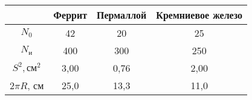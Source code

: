\begin{tabular}{cccc}
\toprule
& Феррит & Пермаллой & Кремниевое железо \\
\midrule
$N_0$               & 42    & 20    & 25    \\
$N_\text{и}$        & 400   & 300   & 250   \\
$S^2, \text{см}^2$  & 3,00  & 0,76  & 2,00  \\
$2\pi R$, см        & 25,0  & 13,3  & 11,0  \\
\bottomrule
\end{tabular}